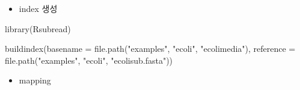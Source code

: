\documentclass[
]{book}
\newenvironment{Shaded}{\begin{snugshade}}{\end{snugshade}}
\newcommand{\AttributeTok}[1]{\textcolor[rgb]{0.77,0.63,0.00}{#1}}
\newcommand{\FunctionTok}[1]{\textcolor[rgb]{0.00,0.00,0.00}{#1}}
\newcommand{\NormalTok}[1]{#1}
\newcommand{\StringTok}[1]{\textcolor[rgb]{0.31,0.60,0.02}{#1}}
\providecommand{\tightlist}{%
  \setlength{\itemsep}{0pt}\setlength{\parskip}{0pt}}
\begin{document}
\begin{itemize}
\tightlist
\item
  index 생성
\end{itemize}

\begin{Shaded}
\begin{Highlighting}[]
\FunctionTok{library}\NormalTok{(Rsubread)}

\FunctionTok{buildindex}\NormalTok{(}\AttributeTok{basename =} \FunctionTok{file.path}\NormalTok{(}\StringTok{"examples"}\NormalTok{, }\StringTok{"ecoli"}\NormalTok{, }\StringTok{"ecolimedia"}\NormalTok{), }
           \AttributeTok{reference =} \FunctionTok{file.path}\NormalTok{(}\StringTok{"examples"}\NormalTok{, }\StringTok{"ecoli"}\NormalTok{, }\StringTok{"ecolisub.fasta"}\NormalTok{))}
\end{Highlighting}
\end{Shaded}

\begin{itemize}
\tightlist
\item
  mapping
\end{itemize}
\end{document}
